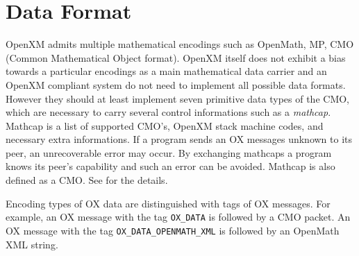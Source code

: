 
\section{Data Format}   

OpenXM admits multiple mathematical encodings such as OpenMath, MP, CMO
(Common Mathematical Object format).
OpenXM itself does not exhibit a bias towards a particular encodings 
as a main mathematical data carrier and an OpenXM compliant system do not need to
implement all possible data formats.
However  they should at least implement seven primitive 
data types of the CMO, which are necessary to 
carry several control informations such as a {\it mathcap}.
Mathcap is a list of supported CMO's, OpenXM stack machine codes, 
and necessary extra informations.
If a program sends an OX messages unknown to its peer, 
an unrecoverable error may occur. 
By exchanging mathcaps a program knows its peer's capability 
and such an error can be avoided.
Mathcap is also defined as a CMO.
See \cite{noro-takayama} for the details.

Encoding types of OX data are distinguished with tags
of OX messages.
For example,
an OX message with the tag 
{\tt OX\_DATA} is followed by a CMO packet.
An OX message with the tag 
{\tt OX\_DATA\_OPENMATH\_XML} is followed by 
an OpenMath XML string.

